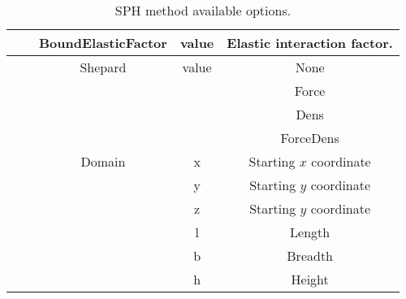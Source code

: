 \begin{table}[h!b!p!]
\begin{tabular}{| c | c | c | c | c | }
		\hline
		       &      & BoundElasticFactor & value  & Elastic interaction factor. \\
		\hline
		       &      & Shepard            & value  & None \\
		       &      &                    &        & Force \\
		       &      &                    &        & Dens \\
		       &      &                    &        & ForceDens \\
		\hline
		       &      & Domain             & x      & Starting $x$ coordinate \\
		       &      &                    & y      & Starting $y$ coordinate \\
		       &      &                    & z      & Starting $y$ coordinate \\
		       &      &                    & l      & Length \\
		       &      &                    & b      & Breadth \\
		       &      &                    & h      & Height \\
		\hline
	\end{tabular}
	\caption{SPH method available options.}
	\label{tables:caseSetup:SPH:Options}
\end{table}
%
